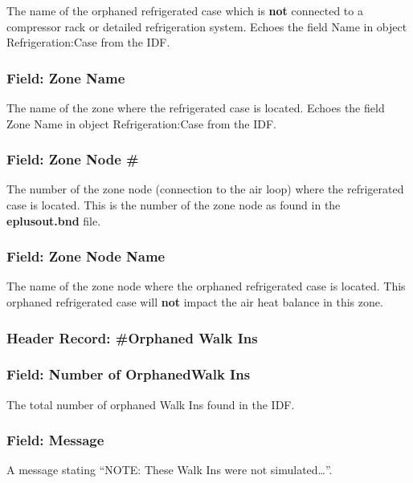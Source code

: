 The name of the orphaned refrigerated case which is \textbf{not} connected to a compressor rack or detailed refrigeration system. Echoes the field Name in object Refrigeration:Case from the IDF.

\subsubsection{Field: Zone Name}\label{field-zone-name-14}

The name of the zone where the refrigerated case is located. Echoes the field Zone Name in object Refrigeration:Case from the IDF.

\subsubsection{Field: Zone Node \#}\label{field-zone-node-1}

The number of the zone node (connection to the air loop) where the refrigerated case is located. This is the number of the zone node as found in the \textbf{eplusout.bnd} file.

\subsubsection{Field: Zone Node Name}\label{field-zone-node-name-1}

The name of the zone node where the orphaned refrigerated case is located. This orphaned refrigerated case will \textbf{not} impact the air heat balance in this zone.

\subsubsection{Header Record: \#Orphaned Walk Ins}\label{header-record-orphaned-walk-ins}

\subsubsection{Field: Number of OrphanedWalk Ins}\label{field-number-of-orphanedwalk-ins}

The total number of orphaned Walk Ins found in the IDF.

\subsubsection{Field: Message}\label{field-message-1}

A message stating ``NOTE: These Walk Ins were not simulated\ldots{}''.

